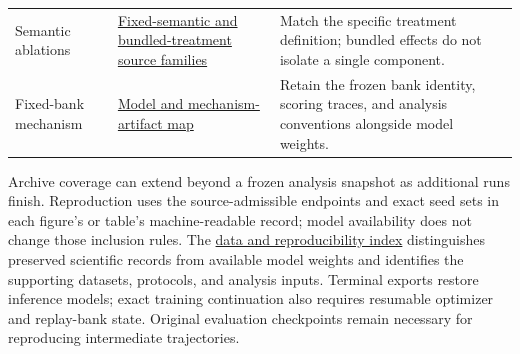\documentclass{article}
\newcommand{\1}{\mathbf 1}
\theoremstyle{remark}
\theoremstyle{definition}
\theoremstyle{plain}
\begin{document}
\begin{table}[H]
\begin{tabularx}{\linewidth}{@{}P{.24\linewidth}YP{.37\linewidth}@{}}
    Semantic ablations &
      \href{https://huggingface.co/od2961/maxent-grpo-models/blob/main/EXPERIMENTS.md\#semantic-ablations}{Fixed-semantic and bundled-treatment source families} &
      Match the specific treatment definition; bundled effects do not isolate a single component. \\
    Fixed-bank mechanism &
      \href{https://huggingface.co/od2961/maxent-grpo-models/blob/main/EXPERIMENTS.md\#mechanism-studies}{Model and mechanism-artifact map} &
      Retain the frozen bank identity, scoring traces, and analysis conventions alongside model weights. \\
    \bottomrule
  \end{tabularx}
\end{table}

Archive coverage can extend beyond a frozen analysis snapshot as additional
runs finish. Reproduction uses the source-admissible endpoints and exact seed
sets in each figure's or table's machine-readable record; model availability
does not change those inclusion rules. The
\href{https://huggingface.co/od2961/maxent-grpo-models/blob/main/EXPERIMENTS.md\#reproducibility}{data and reproducibility index}
distinguishes preserved scientific records from available model weights and
identifies the supporting datasets, protocols, and analysis inputs. Terminal
exports restore inference models; exact training continuation also requires
resumable optimizer and replay-bank state. Original evaluation checkpoints
remain necessary for reproducing intermediate trajectories.
\end{document}
